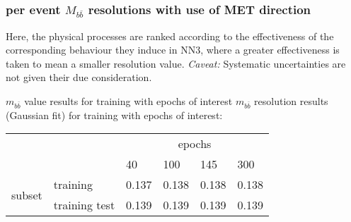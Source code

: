 \begin{frame}
\frametitle{per event ${M_{b\bar{b}}}$ resolutions with use of MET direction}
\small Here, the physical processes are ranked according to the effectiveness of the corresponding behaviour they induce in NN3, where a greater effectiveness is taken to mean a smaller resolution value. \emph{Caveat:} Systematic uncertainties are not given their due consideration.
\begin{center}
\end{center}
\end{frame}

\begin{frame}{${m_{b\bar{b}}}$ value results for training with epochs of interest}
${m_{b\bar{b}}}$ resolution results (Gaussian fit) for training with epochs of interest:
\begin{table}[h]
\begin{tabular}{ll|llll|}
\cline{3-6}
&&\multicolumn{4}{c|}{epochs}\\
\cline{3-6}
&&40&100&145&300\\
\hline
\multicolumn{1}{|l|}{\multirow{2}{*}{subset}}	&training&0.137& 0.138&0.138&0.138\\
\multicolumn{1}{|l|}{}							&training test&0.139&0.139&0.139&0.139\\
\hline
\end{tabular}
\end{table}
\end{frame}

